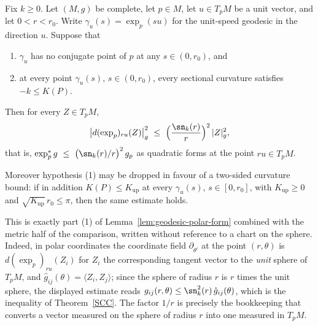 \begin{lemma}
\label{lem:exp-pullback-metric-comparison}
\leanok
Fix $k\ge0$. Let $(M,g)$ be complete, let $p\in M$, let $u\in T_pM$ be a unit
vector, and let $0<r<r_0$. Write $\gamma_u(s)=\exp_p(su)$ for the unit-speed
geodesic in the direction $u$. Suppose that
\begin{enumerate}
\item $\gamma_u$ has no conjugate point of $p$ at any $s\in(0,r_0)$, and
\item at every point $\gamma_u(s)$, $s\in(0,r_0)$, every sectional curvature
satisfies $-k\le K(P)$.
\end{enumerate}
Then for every $Z\in T_pM$,
$$\bigl|d(\exp_p)_{ru}(Z)\bigr|_g^2\ \le\
\Bigl(\frac{\sn_{k}(r)}{r}\Bigr)^{2}\,|Z|_g^2,$$
that is, $\exp_p^{*}g\ \le\ \bigl(\sn_{k}(r)/r\bigr)^{2}\,g_p$ as quadratic
forms at the point $ru\in T_pM$.

Moreover hypothesis (1) may be dropped in favour of a two-sided curvature
bound: if in addition $K(P)\le K_{\mathrm{up}}$ at every $\gamma_u(s)$,
$s\in[0,r_0]$, with $K_{\mathrm{up}}\ge0$ and
$\sqrt{K_{\mathrm{up}}}\,r_0\le\pi$, then the same estimate holds.
\end{lemma}

This is exactly part (1) of Lemma~\ref{lem:geodesic-polar-form} combined with
the metric half of the comparison, written without reference to a chart on the
sphere. Indeed, in polar coordinates the coordinate field
$\partial_{\theta^i}$ at the point $(r,\theta)$ is $d(\exp_p)_{ru}(Z_i)$ for
$Z_i$ the corresponding tangent vector to the \emph{unit} sphere of $T_pM$, and
$\hat g_{ij}(\theta)=\langle Z_i,Z_j\rangle$; since the sphere of radius $r$ is
$r$ times the unit sphere, the displayed estimate reads
$g_{ij}(r,\theta)\le\sn_k^2(r)\,\hat g_{ij}(\theta)$, which is the inequality
of Theorem~\ref{SCC}. The factor $1/r$ is precisely the bookkeeping that
converts a vector measured on the sphere of radius $r$ into one measured in
$T_pM$.

